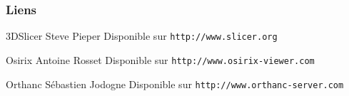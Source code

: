 \documentclass[11pt]{beamer}
\begin{document}
\begin{frame}
  \frametitle{Liens}
    
  \begin{thebibliography}{10}
        
  \beamertemplatearticlebibitems
 
  	3DSlicer
    \newblock Steve Pieper
    \newblock Disponible sur {\tt http://www.slicer.org}

   \beamertemplatearticlebibitems
 
  	Osirix
    \newblock Antoine Rosset
    \newblock Disponible sur {\tt http://www.osirix-viewer.com}
    
      \beamertemplatearticlebibitems
 
  	Orthanc
    \newblock Sébastien Jodogne
    \newblock Disponible sur {\tt http://www.orthanc-server.com}
 
  \end{thebibliography}
\end{frame}
\end{document}
